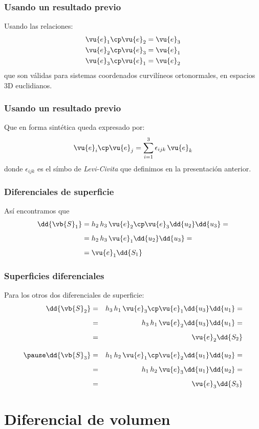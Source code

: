 \begin{frame}
\frametitle{Usando un resultado previo}
Usando las relaciones:
\begin{align*}
\vu{e}_{1} \cp \vu{e}_{2} = \vu{e}_{3} \\
\vu{e}_{2} \cp \vu{e}_{3} = \vu{e}_{1} \\
\vu{e}_{3} \cp \vu{e}_{1} = \vu{e}_{2}
\end{align*}
que son válidas para sistemas coordenados curvilíneos ortonormales, en espacios 3D euclidianos.
\end{frame}
\begin{frame}
\frametitle{Usando un resultado previo}
Que en forma sintética queda expresado por:
\begin{align}
\vu{e}_{i} \cp \vu{e}_{j} = \sum_{i=1}^{3} \epsilon_{ijk} \, \vu{e}_{k}
\end{align}
donde $\epsilon_{ijk}$ es el símbo de \emph{Levi-Civita} que definimos en la presentación anterior.
\end{frame}
\begin{frame}
\frametitle{Diferenciales de superficie}
Así encontramos que
\begin{align*}
\dd{\vb{S}_{1}} &= h_{2} \, h_{3} \, \vu{e}_{2} \cp \vu{e}_{3} \dd{u_{2}} \dd{u_{3}} = \\[0.5em]
&= h_{2} \, h_{3} \, \vu{e}_{1} \dd{u_{2}} \dd{u_{3}} = \\[0.5em]
&= \vu{e}_{1} \dd{S_{1}}
\end{align*}
\end{frame}
\begin{frame}
\frametitle{Superficies diferenciales}
Para los otros dos diferenciales de superficie:
\fontsize{12}{12}\selectfont
\begin{eqnarray*}
\dd{\vb{S}_{2}} &=& h_{3} \, h_{1} \, \vu{e}_{3} \cp \vu{e}_{1} \dd{u_{3}} \dd{u_{1}} = \\[0.5em]
&=& h_{3} \, h_{1} \, \vu{e}_{2} \dd{u_{3}} \dd{u_{1}} = \\[0.5em]
&=& \vu{e}_{2} \dd{S_{2}} \\[1em]
\pause
\dd{\vb{S}_{3}} &=& h_{1} \, h_{2} \, \vu{e}_{1} \cp \vu{e}_{2} \dd{u_{1}} \dd{u_{2}} = \\[0.5em]
&=& h_{1} \, h_{2} \, \vu{e}_{3} \dd{u_{1}} \dd{u_{2}} = \\[0.5em]
&=& \vu{e}_{3} \dd{S_{3}}
\end{eqnarray*}
\end{frame}
\section{Diferencial de volumen}
